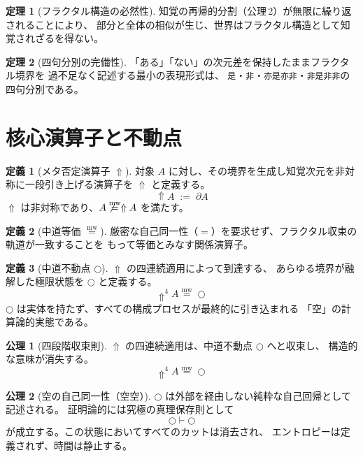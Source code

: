 \documentclass[11pt,a4paper]{ltjsarticle}
\newcommand{\mweq}{\mathrel{\overset{\mathrm{mw}}{=}}}
\newcommand{\metanegation}{\Uparrow}
\newcommand{\dfix}{\bigcirc}
\theoremstyle{definition}
\newtheorem{definition}{定義}[section]
\newtheorem{axiom}{公理}[section]
\newtheorem{theorem}{定理}[section]
\begin{document}
\begin{theorem}[フラクタル構造の必然性]
知覚の再帰的分割（公理\,2）が無限に繰り返されることにより、
部分と全体の相似が生じ、世界はフラクタル構造として知覚されざるを得ない。
\end{theorem}

\begin{theorem}[四句分別の完備性]
「ある」「ない」の次元差を保持したままフラクタル境界を
過不足なく記述する最小の表現形式は、
\texttt{是}・\texttt{非}・\texttt{亦是亦非}・\texttt{非是非非}の四句分別である。
\end{theorem}

\section{核心演算子と不動点}

\begin{definition}[メタ否定演算子 $\metanegation$]
対象 $A$ に対し、その境界を生成し知覚次元を非対称に一段引き上げる演算子を
$\metanegation$ と定義する。
\[
\metanegation A \;:=\; \partial A
\]
$\metanegation$ は非対称であり、$A \not\mweq \metanegation A$ を満たす。
\end{definition}

\begin{definition}[中道等価 $\mweq$]
厳密な自己同一性（$=$）を要求せず、フラクタル収束の軌道が一致することを
もって等価とみなす関係演算子。
\end{definition}

\begin{definition}[中道不動点 $\dfix$]
$\metanegation$ の四連続適用によって到達する、
あらゆる境界が融解した極限状態を $\dfix$ と定義する。
\[
\metanegation^4 A \mweq \dfix
\]
$\dfix$ は実体を持たず、すべての構成プロセスが最終的に引き込まれる
「空」の計算論的実態である。
\end{definition}

\begin{axiom}[四段階収束則]
$\metanegation$ の四連続適用は、中道不動点 $\dfix$ へと収束し、
構造的な意味が消失する。
\[
\metanegation^4 A \mweq \dfix
\]
\end{axiom}

\begin{axiom}[空の自己同一性（空空）]
$\dfix$ は外部を経由しない純粋な自己回帰として記述される。
証明論的には究極の真理保存則として
\[
\dfix \vdash \dfix
\]
が成立する。この状態においてすべてのカットは消去され、
エントロピーは定義されず、時間は静止する。
\end{axiom}
\end{document}
